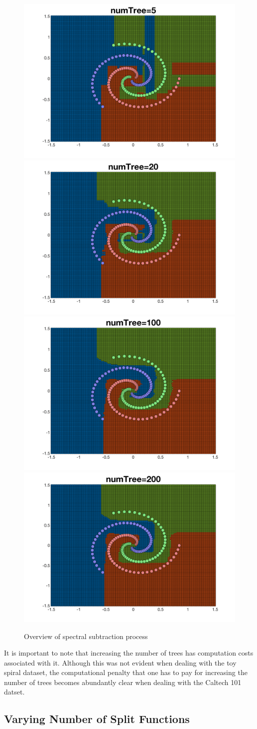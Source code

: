 \documentclass[a4paper,pra,twocolumn,10pt,aps,longbibliography,nobalancelastpage]{revtex4-1}
\begin{document}
\begin{figure}[H]
	\centering
    \includegraphics[width=0.40\columnwidth]{ax_5_trees}
	\includegraphics[width=0.40\columnwidth]{ax_20_trees}
    \includegraphics[width=0.40\columnwidth]{ax_100_trees}
    \includegraphics[width=0.40\columnwidth]{ax_200_trees}
    \caption{Overview of spectral subtraction process}
\end{figure}

It is important to note that increasing the number of trees has computation costs associated with it. Although this was not evident when dealing with the toy spiral dataset, the computational penalty that one has to pay for increasing the number of trees becomes abundantly clear when dealing with the Caltech 101 datset. 

\subsection{Varying Number of Split Functions}
\end{document}
